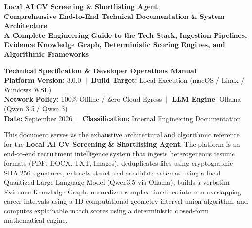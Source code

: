 \documentclass[11pt,a4paper]{report}
\begin{document}
\begin{titlepage}
\begin{center}
    \vspace*{0.8cm}
    
    {\Huge \textbf{\color{primary}Local AI CV Screening \& Shortlisting Agent}}\\[0.4cm]
    {\LARGE \textbf{\color{accent}Comprehensive End-to-End Technical Documentation \& System Architecture}}\\[0.8cm]
    
    {\large \textbf{A Complete Engineering Guide to the Tech Stack, Ingestion Pipelines, Evidence Knowledge Graph, Deterministic Scoring Engines, and Algorithmic Frameworks}}\\[1.2cm]

    \begin{tcolorbox}[enhanced, colback=cardbg, colframe=bordergray, arc=4pt, width=0.96\textwidth]
        \centering
        \textbf{Technical Specification \& Developer Operations Manual}\\[0.2cm]
        \textbf{Platform Version:} 3.0.0 $\;\vert\;$ \textbf{Build Target:} Local Execution (macOS / Linux / Windows WSL)\\
        \textbf{Network Policy:} 100\% Offline / Zero Cloud Egress $\;\vert\;$ \textbf{LLM Engine:} Ollama (Qwen 3.5 / Qwen 3)\\
        \textbf{Date:} September 2026 $\;\vert\;$ \textbf{Classification:} Internal Engineering Documentation
    \end{tcolorbox}
    
    \vspace{1.2cm}

    \begin{tcolorbox}[enhanced, colback=accentlight, colframe=accentdark, arc=3pt, width=0.96\textwidth, title=\textbf{Executive Technical Overview}]
    This document serves as the exhaustive architectural and algorithmic reference for the \textbf{Local AI CV Screening \& Shortlisting Agent}. The platform is an end-to-end recruitment intelligence system that ingests heterogeneous resume formats (PDF, DOCX, TXT, Images), deduplicates files using cryptographic SHA-256 signatures, extracts structured candidate schemas using a local Quantized Large Language Model (Qwen3.5 via Ollama), builds a verbatim Evidence Knowledge Graph, normalizes complex timelines into non-overlapping career intervals using a 1D computational geometry interval-union algorithm, and computes explainable match scores using a deterministic closed-form mathematical engine.
    

\end{tcolorbox}
\end{center}
\end{titlepage}
\end{document}
